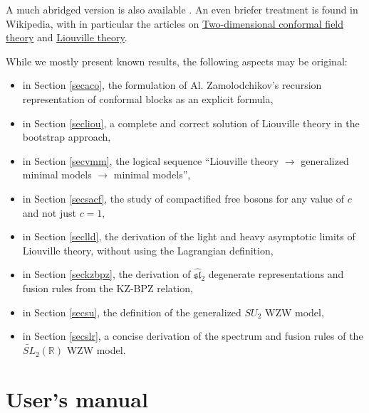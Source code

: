 \documentclass[12pt, a4paper, notitlepage, twoside]{report}
\numberwithin{equation}{section}
\theoremstyle{break}
\begin{document}
A much abridged version is also available \cite{rib16}. An even briefer treatment is found in Wikipedia, with in particular the articles on \href{https://en.wikipedia.org/wiki/Two-dimensional_conformal_field_theory}{Two-dimensional conformal field theory} and \href{https://en.wikipedia.org/wiki/Liouville_field_theory}{Liouville theory}.

While we mostly present known results, the following aspects may be original:
\begin{itemize}
\item in Section \ref{secaco}, the formulation of Al. Zamolodchikov's recursion representation of conformal blocks as an explicit formula,
\item in Section \ref{secliou}, a complete and correct solution of Liouville theory in the bootstrap approach, 
\item in Section \ref{secvmm}, the logical sequence ``Liouville theory $\rightarrow$ generalized minimal models $\rightarrow$ minimal models'',
\item in Section \ref{secsacf}, the study of compactified free bosons for any value of $c$ and not just $c=1$,
\item in Section \ref{seclld}, the derivation of the light and heavy asymptotic limits of Liouville theory, without using the Lagrangian definition,
\item in Section \ref{seckzbpz}, the derivation of $\widehat{\mathfrak{sl}}_2$ degenerate representations and fusion rules from the KZ-BPZ relation,
\item in Section \ref{secsu}, the definition of the generalized $SU_2$ WZW model,
\item in Section \ref{secslr}, a concise derivation of the spectrum and fusion rules of the $\widetilde{SL}_2(\mathbb{R})$ WZW model.
\end{itemize}


\section{User's manual}
\end{document}
